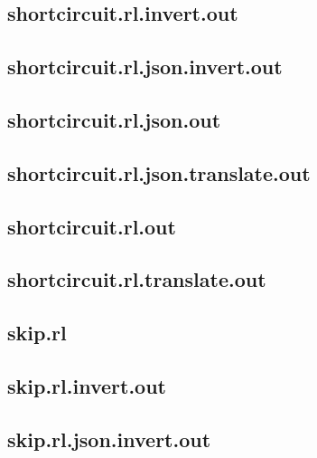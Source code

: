 \subsection{shortcircuit.rl.invert.out}
\label{app:shortcircuit_rl.invert.out}

\subsection{shortcircuit.rl.json.invert.out}
\label{app:shortcircuit_rl.json.invert.out}

\subsection{shortcircuit.rl.json.out}
\label{app:shortcircuit_rl.json.out}

\subsection{shortcircuit.rl.json.translate.out}
\label{app:shortcircuit_rl.json.translate.out}

\subsection{shortcircuit.rl.out}
\label{app:shortcircuit_rl.out}

\subsection{shortcircuit.rl.translate.out}
\label{app:shortcircuit_rl.translate.out}

\subsection{skip.rl}
\label{app:skip_rl}

\subsection{skip.rl.invert.out}
\label{app:skip_rl.invert.out}

\subsection{skip.rl.json.invert.out}
\label{app:skip_rl.json.invert.out}

